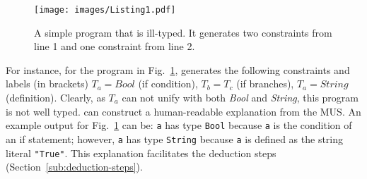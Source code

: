 

\begin{figure}[ht]
    \centering
\texttt{[image: images/Listing1.pdf]}
    \caption[An example to illustrate constraint generation in \chameleon{}]{A simple program that is ill-typed. It generates two constraints from line 1 and one constraint from line 2. }
    \label{fig:listing1}
\end{figure}

For instance, for the program in Fig.~\ref{fig:listing1}, \chameleon{}  generates the following constraints and labels (in brackets) $T_a = Bool$ (if condition), $T_b = T_c$ (if branches), $T_a= String$  (definition). Clearly, as $T_a$ can not unify with both \textit{Bool} and \textit{String}, this program is not well typed. \chameleon{} can construct a human-readable explanation from the MUS. An example output for Fig.~\ref{fig:listing1} can be: \texttt{a} has type \texttt{Bool} because \texttt{a} is the condition of an if statement; however, \texttt{a} has type \texttt{String} because \texttt{a} is defined as the string literal \texttt{"True"}. This explanation facilitates the deduction steps (Section~\ref{sub:deduction-steps}). 






